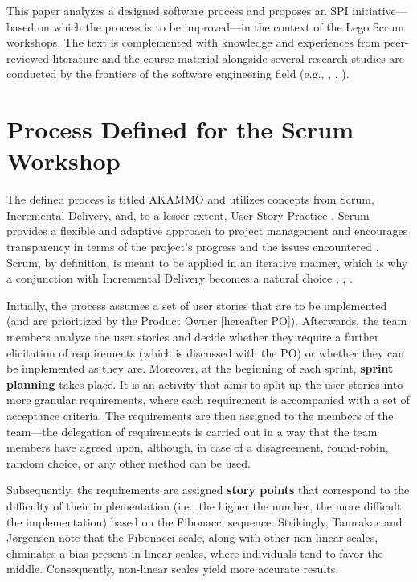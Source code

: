 \documentclass[conference]{IEEEtran}
\begin{document}
This paper analyzes a designed software process and proposes an SPI
initiative---based on which the process is to be improved---in the context of
the Lego Scrum workshops. The text is complemented with knowledge and
experiences from peer-reviewed literature and the course material alongside
several research studies are conducted by the frontiers of the software
engineering field (e.g., \cite{Basili1988}, \cite{Caldiera1994},
\cite{Schwaber2020}).

\section{Process Defined for the Scrum Workshop}
\label{sec:process}


The defined process is titled {\selectfont AKAMMO} and
utilizes concepts from Scrum, Incremental Delivery, and, to a lesser extent,
User Story Practice \cite{DIT348A1}. Scrum provides a flexible and adaptive
approach to project management and encourages transparency in terms of the
project's progress and the issues encountered \cite{Schwaber2020}. Scrum, by
definition, is meant to be applied in an iterative manner, which is why a
conjunction with Incremental Delivery becomes a natural choice
\cite{Schwaber2020}, \cite{Srivastava2017}, \cite{Schwaber1997}.

Initially, the process assumes a set of user stories that are to be implemented
(and are prioritized by the Product Owner [hereafter PO]). Afterwards, the team
members analyze the user stories and decide whether they require a further
elicitation of requirements (which is discussed with the PO) or whether they
can be implemented as they are.
Moreover, at the beginning of each sprint, \textbf{sprint planning} takes
place. It is an activity that aims to split up the user stories into more
granular requirements, where each requirement is accompanied with a set of
acceptance criteria. The requirements are then assigned to the members of
the team---the delegation of requirements is carried out in a way that the team
members have agreed upon, although, in case of a disagreement, round-robin,
random choice, or any other method can be used. 

Subsequently, the requirements are assigned \textbf{story points} that
correspond to the difficulty of their implementation (i.e., the higher
the number, the more difficult the implementation) based on the Fibonacci
sequence. Strikingly, Tamrakar and J\o{}rgensen \cite{Tamrakar2012} note that
the Fibonacci scale, along with other non-linear scales, eliminates a bias
present in linear scales, where individuals tend to favor the middle.
Consequently, non-linear scales yield more accurate results.
\end{document}
